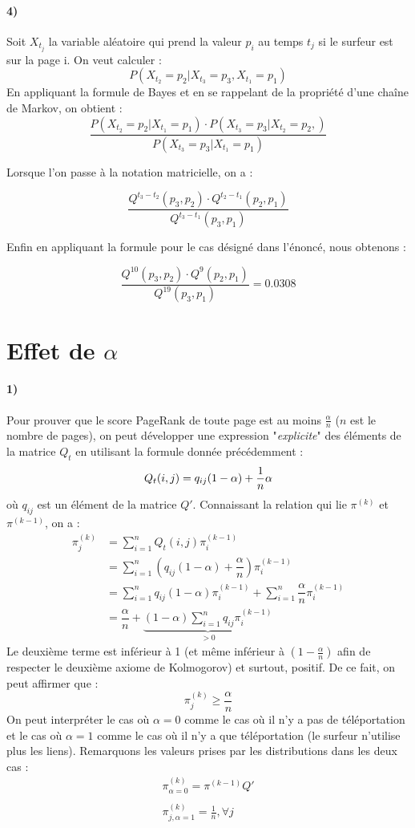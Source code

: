 \documentclass[a4paper,titlepage]{report}
\begin{document}
\paragraph{4)}
Soit $ X_{t_j}$ la variable aléatoire qui prend la valeur $p_i$ au temps $t_j$ si le surfeur est sur la page i.
On veut calculer : $$
P(X_{t_2} = p_2 | X_{t_3} = p_3 , X_{t_1} = p_1)
$$
En appliquant la formule de Bayes et en se rappelant de la propriété d'une chaîne de Markov, on obtient :
$$ \dfrac{P(X_{t_2} = p_2 | X_{t_1} = p_1) \cdot P(X_{t_3} = p_3 | X_{t_2} = p_2,)}{P(X_{t_3} = p_3 | X_{t_1} = p_1)} $$

Lorsque l'on passe à la notation matricielle, on a :

$$\dfrac{Q^{t_3 - t_2}(p_3, p_2) \cdot Q^{t_2 - t_1}(p_2, p_1)}{Q^{t_3 - t_1}(p_3, p_1)}
$$

Enfin en appliquant la formule pour le cas désigné dans l'énoncé, nous obtenons :

$$\dfrac{Q^{10}(p_3, p_2) \cdot Q^{9}(p_2, p_1)}{Q^{19}(p_3, p_1)} = 0.0308
$$

\section{Effet de $\alpha$}
\label{sec:effet_alpha}
\paragraph{1)}
Pour prouver que le score PageRank de toute page est au moins $\frac{\alpha}{n}$ ($n$ est le nombre de pages), on peut développer une expression "\textit{explicite}" des éléments de la matrice $Q_t$ en utilisant la formule donnée précédemment : 
\[
Q_t(i,j) = q_{ij} (1 - \alpha) + \dfrac{1}{n}\alpha\\
\]
où $q_{ij}$ est un élément de la matrice $Q'$. Connaissant la relation qui lie $\pi^{(k)}$ et $\pi^{(k-1)}$, on a :
\[
\begin{aligned}
\pi^{(k)}_j &= \sum\limits_{i = 1}^n Q_t(i,j)\pi^{(k-1)}_i\\
 &= \sum\limits_{i = 1}^n \left(q_{ij} (1 - \alpha) + \dfrac{\alpha}{n}\right)\pi^{(k-1)}_i\\
 &= \sum\limits_{i = 1}^n q_{ij} (1 - \alpha) \pi^{(k-1)}_i + \sum\limits_{i = 1}^n \dfrac{\alpha}{n} \pi^{(k-1)}_i\\
 &= \dfrac{\alpha}{n} + \underbrace{(1 - \alpha) \sum\limits_{i = 1}^n q_{ij} \pi^{(k-1)}_i}_{> 0}
\end{aligned}
\]
Le deuxième terme est inférieur à 1 (et même inférieur à $(1 - \frac{\alpha}{n})$ afin de respecter le deuxième axiome de Kolmogorov) et surtout, positif. De ce fait, on peut affirmer que :
\[
\pi^{(k)}_j \geq \dfrac{\alpha}{n}
\]
On peut interpréter le cas où $\alpha = 0$ comme le cas où il n'y a pas de téléportation et le cas où $\alpha = 1$ comme le cas où il n'y a que téléportation (le surfeur n'utilise plus les liens). Remarquons les valeurs prises par les distributions dans les deux cas :
\[
\begin{array}{l}
\pi_{\alpha = 0}^{(k)} = \pi^{(k-1)} Q'\\ \\
\pi_{j,\alpha = 1}^{(k)} = \frac{1}{n}, \forall j
\end{array}
\]
\end{document}
